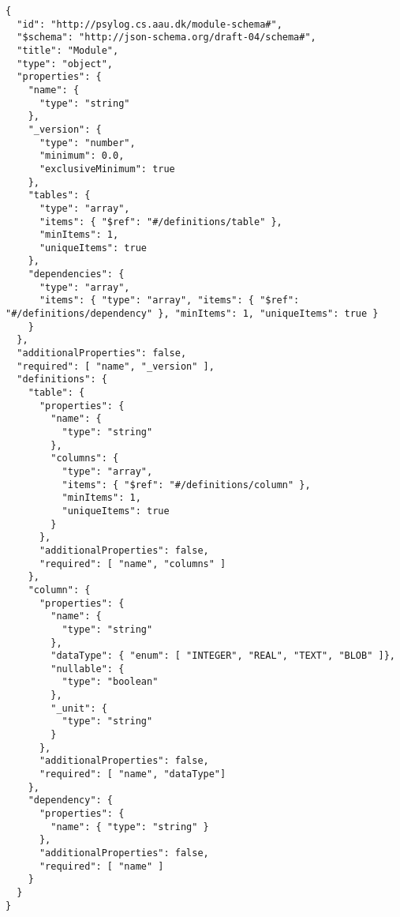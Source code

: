 \label{app:json_schema}
\begin{lstlisting}
{
  "id": "http://psylog.cs.aau.dk/module-schema#",
  "$schema": "http://json-schema.org/draft-04/schema#",
  "title": "Module",
  "type": "object",
  "properties": {
    "name": {
      "type": "string"
    },
    "_version": {
      "type": "number",
      "minimum": 0.0,
      "exclusiveMinimum": true
    },
    "tables": {
      "type": "array",
      "items": { "$ref": "#/definitions/table" },
      "minItems": 1,
      "uniqueItems": true
    },
    "dependencies": {
      "type": "array",
      "items": { "type": "array", "items": { "$ref": "#/definitions/dependency" }, "minItems": 1, "uniqueItems": true }
    }
  },
  "additionalProperties": false,
  "required": [ "name", "_version" ],
  "definitions": {
    "table": {
      "properties": {
        "name": {
          "type": "string"
        },
        "columns": {
          "type": "array",
          "items": { "$ref": "#/definitions/column" },
          "minItems": 1,
          "uniqueItems": true
        }
      },
      "additionalProperties": false,
      "required": [ "name", "columns" ]
    },
    "column": {
      "properties": {
        "name": {
          "type": "string"
        },
        "dataType": { "enum": [ "INTEGER", "REAL", "TEXT", "BLOB" ]},
        "nullable": {
          "type": "boolean"
        },
        "_unit": {
          "type": "string"
        }
      },
      "additionalProperties": false,
      "required": [ "name", "dataType"]
    },
    "dependency": {
      "properties": {
        "name": { "type": "string" }
      },
      "additionalProperties": false,
      "required": [ "name" ]
    }
  }
}
\end{lstlisting}